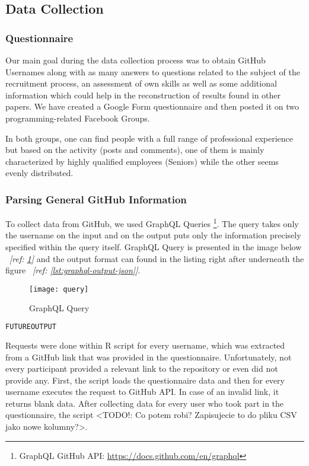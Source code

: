\subsection{Data Collection}
\label{sec:data-collection}

\subsubsection{Questionnaire}
\label{sec:questionnaire}

Our main goal during the data collection process was to obtain GitHub Usernames along with as many answers to questions related to the subject of the recruitment process, an assessment of own skills as well as some additional information which could help in the reconstruction of results found in other papers. We have created a Google Form questionnaire and then posted it on two programming-related Facebook Groups.

In both groups, one can find people with a full range of professional experience but based on the activity (posts and comments), one of them is mainly characterized by highly qualified employees (Seniors) while the other seems evenly distributed.

\subsubsection{Parsing General GitHub Information}
\label{sec:github-info-parsing}

To collect data from GitHub, we used GraphQL Queries \footnote{GraphQL GitHub API: \url{https://docs.github.com/en/graphql}}. The query takes only the username on the input and on the output puts only the information precisely specified within the query itself. GraphQL Query is presented in the image below ~\textit{[ref: \ref{fig:graph-ql-query}]} and the output format can found in the listing right after underneath the figure ~\textit{[ref: \ref{lst:graphql-output-json}]}.

\begin{figure}[htp]
\centering
\texttt{[image: query]}
\caption{GraphQL Query}
\label{fig:graph-ql-query}
\end{figure}

\begin{lstlisting}[language=Python, label={lst:graphql-output-json}]
FUTUREOUTPUT
\end{lstlisting} 

Requests were done within R script for every username, which was extracted from a GitHub link that was provided in the questionnaire. Unfortunately, not every participant provided a relevant link to the repository or even did not provide any. First, the script loads the questionnaire data and then for every username executes the request to GitHub API. In case of an invalid link, it returns blank data. After collecting data for every user who took part in the questionnaire, the script <TODO!: Co potem robi? Zapisujecie to do pliku CSV jako nowe kolumny?>.


